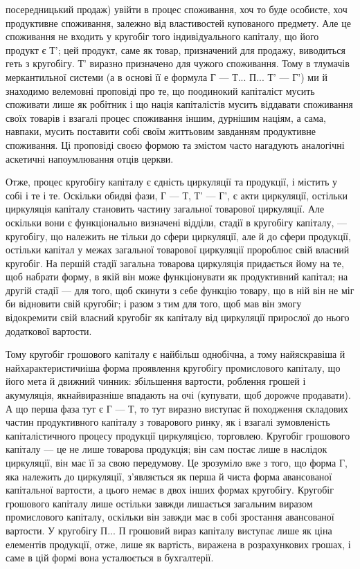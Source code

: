 \parcont{}  %
посередницький продаж) увійти в процес споживання, хоч то буде
особисте, хоч продуктивне споживання, залежно від властивостей купованого
предмету. Але це споживання не входить у кругобіг того індивідуального
капіталу, що його продукт є Т'; цей продукт, саме як товар,
призначений для продажу, виводиться геть з кругобігу. Т' виразно
призначено для чужого споживання. Тому в тлумачів меркантильної
системи (а в основі її е формула Г — Т... П... Т' — Г') ми й знаходимо
велемовні проповіді про те, що поодинокий капіталіст мусить споживати
лише як робітник і що нація капіталістів мусить віддавати споживання
своїх товарів і взагалі процес споживання іншим, дурнішим
націям, а сама, навпаки, мусить поставити собі своїм життьовим
завданням продуктивне споживання. Ці проповіді своєю формою та
змістом часто нагадують аналогічні аскетичні напоумлювання отців
церкви.

Отже, процес кругобігу капіталу є єдність циркуляції та продукції,
і містить у собі і те і те. Оскільки обидві фази, Г — Т, Т' — Г', є акти
циркуляції, остільки циркуляція капіталу становить частину загальної
товарової циркуляції. Але оскільки вони є функціонально визначені відділи,
стадії в кругобігу капіталу, — кругобігу, що належить не тільки до
сфери циркуляції, але й до сфери продукції, остільки капітал у межах
загальної товарової циркуляції пророблює свій власний кругобіг. На першій
стадії загальна товарова циркуляція придається йому на те, щоб набрати
форму, в якій він може функціонувати як продуктивний капітал; на
другій стадії — для того, щоб скинути з себе функцію товару, що в ній
він не міг би відновити свій кругобіг; і разом з тим для того, щоб мав
він змогу відокремити свій власний кругобіг як капіталу від циркуляції
прирослої до нього додаткової вартости.

Тому кругобіг грошового капіталу є найбільш однобічна, а тому
найяскравіша й найхарактеристичиіша форма проявлення кругобігу промислового
капіталу, що його мета й движний чинник: збільшення вартости,
роблення грошей і акумуляція, якнайвиразніше впадають на очі (купувати,
щоб дорожче продавати). А що перша фаза тут є Г — Т, то тут
виразно виступає й походження складових частин продуктивного капіталу
з товарового ринку, як і взагалі зумовленість капіталістичного процесу
продукції циркуляцією, торговлею. Кругобіг грошового капіталу — це не
лише товарова продукція; він сам постає лише в наслідок циркуляції, він
має її за свою передумову. Це зрозуміло вже з того, що форма Г, яка
належить до циркуляції, з’являється як перша й чиста форма авансованої
капітальної вартости, а цього немає в двох інших формах кругобігу.
Кругобіг грошового капіталу лише остільки завжди лишається загальним
виразом промислового капіталу, оскільки він завжди має в собі зростання
авансованої вартости. У кругобігу П... П грошовий вираз капіталу
виступає лише як ціна елементів продукції, отже, лише як вартість,
виражена в розрахункових грошах, і саме в цій формі вона усталюється
в бухгалтерії.
